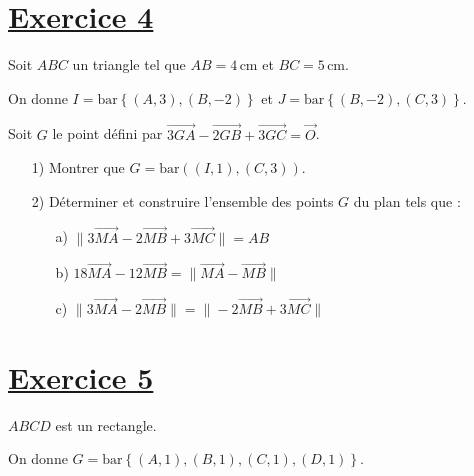 \documentclass[12pt]{article}
\begin{document}
\section*{\underline{Exercice 4}}

Soit \( ABC \) un triangle tel que \( AB = 4 \, \text{cm} \) et \( BC = 5 \, \text{cm} \). 

On donne \( I = \text{bar} \left\lbrace  (A, 3), (B, -2) \right\rbrace  \) et \( J = \text{bar} \left\lbrace  (B, -2), (C, 3) \right\rbrace  \).

Soit \( G \) le point défini par \( \overrightarrow{3GA} - \overrightarrow{2GB} + \overrightarrow{3GC} = \overrightarrow{O} \).

\begin{enumerate}
    \item[1)] Montrer que \( G = \text{bar} \left( (I, 1),(C, 3) \right) \).
    
    \item[2)] Déterminer et construire l'ensemble des points \( G \) du plan tels que :
    \begin{enumerate}
        \item[a)] \( \| 3 \overrightarrow{MA} - 2 \overrightarrow{MB} + 3 \overrightarrow{MC} \| = AB \)
        \item[b)] \( 18 \overrightarrow{MA} - 12 \overrightarrow{MB} = \| \overrightarrow{MA} - \overrightarrow{MB} \| \)
        \item[c)] \( \| 3 \overrightarrow{MA} - 2 \overrightarrow{MB} \| = \| -2\overrightarrow{MB} +3 \overrightarrow{MC} \| \)
    \end{enumerate}
\end{enumerate}

\section*{\underline{Exercice 5}}

\( ABCD \) est un rectangle.

On donne \( G = \text{bar} \left\lbrace (A, 1), (B, 1), (C, 1), (D, 1) \right\rbrace  \).
\end{document}
